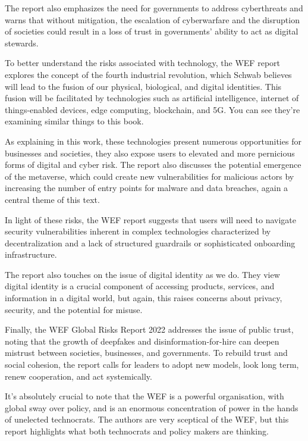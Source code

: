 The report also emphasizes the need for governments to address cyberthreats and warns that without mitigation, the escalation of cyberwarfare and the disruption of societies could result in a loss of trust in governments' ability to act as digital stewards.\par
To better understand the risks associated with technology, the WEF report explores the concept of the fourth industrial revolution, which Schwab believes will lead to the fusion of our physical, biological, and digital identities. This fusion will be facilitated by technologies such as artificial intelligence, internet of things-enabled devices, edge computing, blockchain, and 5G. You can see they're examining similar things to this book.\par
As explaining in this work, these technologies present numerous opportunities for businesses and societies, they also expose users to elevated and more pernicious forms of digital and cyber risk. The report also discusses the potential emergence of the metaverse, which could create new vulnerabilities for malicious actors by increasing the number of entry points for malware and data breaches, again a central theme of this text.\par
In light of these risks, the WEF report suggests that users will need to navigate security vulnerabilities inherent in complex technologies characterized by decentralization and a lack of structured guardrails or sophisticated onboarding infrastructure.\par
The report also touches on the issue of digital identity as we do. They view digital identity is a crucial component of accessing products, services, and information in a digital world, but again, this raises concerns about privacy, security, and the potential for misuse.\par
Finally, the WEF Global Risks Report 2022 addresses the issue of public trust, noting that the growth of deepfakes and disinformation-for-hire can deepen mistrust between societies, businesses, and governments. To rebuild trust and social cohesion, the report calls for leaders to adopt new models, look long term, renew cooperation, and act systemically.\par 
It's absolutely crucial to note that the WEF is a powerful organisation, with global sway over policy, and is an enormous concentration of power in the hands of unelected technocrats. The authors are very sceptical of the WEF, but this report highlights what both technocrats and policy makers are thinking.
